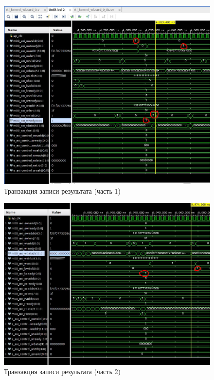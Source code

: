 \FloatBarrier
\begin{figure}[h]
	\begin{center}
		\includegraphics[width=\linewidth]{inc/write1_original.png}
	\end{center}
	\caption{Транзакция записи результата (часть 1)}
\end{figure}
\FloatBarrier

\FloatBarrier
\begin{figure}[h]
	\begin{center}
		\includegraphics[width=\linewidth]{inc/write2_original.png}
	\end{center}
	\caption{Транзакция записи результата (часть 2)}
\end{figure}
\FloatBarrier

